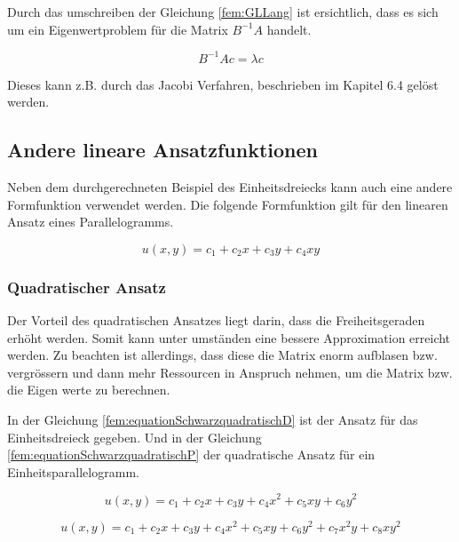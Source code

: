 Durch das umschreiben der Gleichung \ref{fem:GLLang} ist ersichtlich, dass es sich um ein Eigenwertproblem für die Matrix $B^{-1}A$ handelt.

\begin{equation}
		B^{-1}Ac = \lambda c
 \end{equation}
 
Dieses kann z.B. durch das Jacobi Verfahren, beschrieben im Kapitel 6.4 gelöst werden.
 
\subsection{Andere lineare Ansatzfunktionen
\label{fem:subsection:Ansatzfunktionen}}

Neben dem durchgerechneten Beispiel des Einheitsdreiecks kann auch eine andere Formfunktion verwendet werden. Die folgende Formfunktion gilt für den linearen Ansatz eines Parallelogramms.

\begin{equation}
	u(x,y) = c_1 + c_2 x + c_3 y + c_4 xy
\end{equation} 


\subsubsection{Quadratischer Ansatz
\label{fem:subsection:bonorum}}

Der Vorteil des quadratischen Ansatzes liegt darin, dass die Freiheitsgeraden erhöht werden. Somit kann unter umständen eine bessere Approximation erreicht werden.
Zu beachten ist allerdings, dass diese die Matrix enorm aufblasen bzw. vergrössern und dann mehr Ressourcen in Anspruch nehmen, um die Matrix bzw. die Eigen werte zu berechnen.

In der Gleichung \ref{fem:equationSchwarzquadratischD}  ist der Ansatz für das Einheitsdreieck gegeben. Und in der Gleichung \ref{fem:equationSchwarzquadratischP} der quadratische Ansatz für ein Einheitsparallelogramm.

\begin{equation}
	u(x,y) = c_1 + c_2 x + c_3 y + c_4 x^2 + c_5 xy + c_6 y^2
	\label{fem:equationSchwarzquadratischD}
\end{equation}

\begin{equation}
	u(x,y) = c_1 + c_2 x + c_3 y + c_4 x^2 + c_5 xy + c_6 y^2 + c_7 x^2y + c_8 xy^2
	\label{fem:equationSchwarzquadratischP}
\end{equation} 



